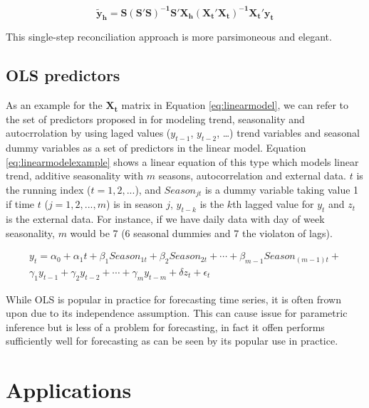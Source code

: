 \documentclass[11pt,a4paper,]{article}
\begin{document}
\begin{equation}\label{eq:reconciledforecastsonestep}
   \boldsymbol{\tilde{y}_h} = \mathbf{S(S'S)^{-1}S'}\mathbf{X_h}\mathbf{(X_t'X_t)^{-1}X_t'}\mathbf{y_t}
\end{equation}

This single-step reconciliation approach is more parsimoneous and
elegant.

\subsection{OLS predictors}\label{ols-predictors}

As an example for the \(\mathbf{X_t}\) matrix in Equation
\eqref{eq:linearmodel}, we can refer to the set of predictors proposed in
\textcite{ashouri2018} for modeling trend, seasonality and
autocrrolation by using laged values (\(y_{t-1}\), \(y_{t-2}\),
\ldots{}) trend variables and seasonal dummy variables as a set of
predictors in the linear model. Equation \eqref{eq:linearmodelexample}
shows a linear equation of this type which models linear trend, additive
seasonality with \(m\) seasons, autocorrelation and external data. \(t\)
is the running index (\(t=1,2,...\)), and \(Season_{jt}\) is a dummy
variable taking value 1 if time \(t\) (\(j=1, 2, ..., m\)) is in season
\(j\), \(y_{t-k}\) is the \(k\)th lagged value for \(y_t\) and \(z_t\)
is the external data. For instance, if we have daily data with day of
week seasonality, \(m\) would be 7 (6 seasonal dummies and 7 the
violaton of lags).

\begin{equation}\label{eq:linearmodelexample}
   \begin{split}
   y_t = \alpha_0 + \alpha_1 t + \beta_1 Season_{1t} + \beta_2 Season_{2t} + \cdots + \beta_{m-1} Season_{(m-1)t} + 
   \\
   \gamma_1 y_{t-1} + \gamma_2 y_{t-2} + \cdots + \gamma_m y_{t-m} + \delta z_t + \epsilon_t 
   \end{split}
\end{equation}

While OLS is popular in practice for forecasting time series, it is
often frown upon due to its independence assumption. This can cause
issue for parametric inference but is less of a problem for forecasting,
in fact it offen performs sufficiently well for forecasting as can be
seen by its popular use in practice.

\section{Applications}\label{applications}
\end{document}
